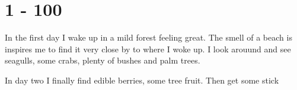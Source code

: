 \documentclass[]{article}
\title{}
\author{}
\begin{document}
\maketitle

\begin{abstract}

\end{abstract}

\section{1 - 100}

In the first day I wake up in a mild forest feeling great. The smell of a beach is inspires me to find it very close by to where I woke up. I look arouund and see seagulls, some crabs, plenty of bushes and palm trees. 


In day two I finally find edible berries, some tree fruit. Then get some stick 
\end{document}
